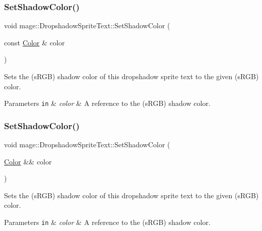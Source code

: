 \subsubsection{\texorpdfstring{Set\+Shadow\+Color()}{SetShadowColor()}\hspace{0.1cm}{\footnotesize\ttfamily [1/3]}}
{\footnotesize\ttfamily void mage\+::\+Dropshadow\+Sprite\+Text\+::\+Set\+Shadow\+Color (\begin{DoxyParamCaption}\item[{const \hyperlink{structmage_1_1_color}{Color} \&}]{color }\end{DoxyParamCaption})\hspace{0.3cm}{\ttfamily [noexcept]}}

Sets the (s\+R\+GB) shadow color of this dropshadow sprite text to the given (s\+R\+GB) color.


\begin{DoxyParams}[1]{Parameters}
\mbox{\tt in}  & {\em color} & A reference to the (s\+R\+GB) shadow color. \\
\hline
\end{DoxyParams}
\hypertarget{classmage_1_1_dropshadow_sprite_text_aa05c94ba64df31046dbdfa3d4d0fdaeb}{}\label{classmage_1_1_dropshadow_sprite_text_aa05c94ba64df31046dbdfa3d4d0fdaeb} 
\subsubsection{\texorpdfstring{Set\+Shadow\+Color()}{SetShadowColor()}\hspace{0.1cm}{\footnotesize\ttfamily [2/3]}}
{\footnotesize\ttfamily void mage\+::\+Dropshadow\+Sprite\+Text\+::\+Set\+Shadow\+Color (\begin{DoxyParamCaption}\item[{\hyperlink{structmage_1_1_color}{Color} \&\&}]{color }\end{DoxyParamCaption})\hspace{0.3cm}{\ttfamily [noexcept]}}

Sets the (s\+R\+GB) shadow color of this dropshadow sprite text to the given (s\+R\+GB) color.


\begin{DoxyParams}[1]{Parameters}
\mbox{\tt in}  & {\em color} & A reference to the (s\+R\+GB) shadow color. \\
\hline
\end{DoxyParams}
\hypertarget{classmage_1_1_dropshadow_sprite_text_a87dd66597ce516d139196d1ce26cb680}{}\label{classmage_1_1_dropshadow_sprite_text_a87dd66597ce516d139196d1ce26cb680} 
